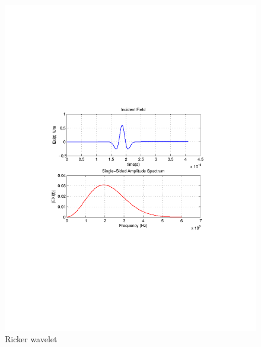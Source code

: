 \begin{figure}[H]
\centering
\includegraphics[scale=0.8, trim=3.5cm 8.7cm 4.5cm 8.85cm, clip]{FigCh03_IncidentFieldRicker.pdf}
\caption{Ricker wavelet}
\label{1DDNG-IncidentField-Ricker}
\end{figure}
